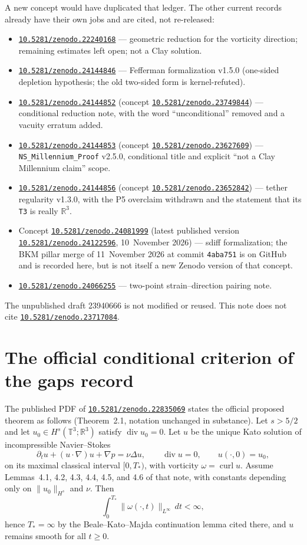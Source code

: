 \documentclass[11pt]{article}
\theoremstyle{plain}
\theoremstyle{definition}
\theoremstyle{remark}
\newcommand{\Tthree}{\mathbb{T}^{3}}
\newcommand{\R}{\mathbb{R}}
\newcommand{\doi}[1]{\href{https://doi.org/#1}{\texttt{#1}}}
\begin{document}
A new concept would have duplicated that ledger. The other current records already have their own jobs and are cited, not re-released:
\begin{itemize}[leftmargin=1.4em]
\item \doi{10.5281/zenodo.22240168} --- geometric reduction for the vorticity direction; remaining estimates left open; not a Clay solution.
\item \doi{10.5281/zenodo.24144846} --- Fefferman formalization v1.5.0 (one-sided depletion hypothesis; the old two-sided form is kernel-refuted).
\item \doi{10.5281/zenodo.24144852} (concept \doi{10.5281/zenodo.23749844}) --- conditional reduction note, with the word ``unconditional'' removed and a vacuity erratum added.
\item \doi{10.5281/zenodo.24144853} (concept \doi{10.5281/zenodo.23627609}) --- \texttt{NS\_\hspace{0pt}Millennium\_\hspace{0pt}Proof} v2.5.0, conditional title and explicit ``not a Clay Millennium claim'' scope.
\item \doi{10.5281/zenodo.24144856} (concept \doi{10.5281/zenodo.23652842}) --- tether regularity v1.3.0, with the P5 overclaim withdrawn and the statement that its \texttt{T3} is really \(\R^{3}\).
\item Concept \doi{10.5281/zenodo.24081999} (latest published version \doi{10.5281/zenodo.24122596}, 10~November 2026) --- sdiff formalization; the BKM pillar merge of 11~November 2026 at commit \texttt{4aba751} is on GitHub and is recorded here, but is not itself a new Zenodo version of that concept.
\item \doi{10.5281/zenodo.24066255} --- two-point strain--direction pairing note.
\end{itemize}
The unpublished draft 23940666 is not modified or reused. This note does not cite \doi{10.5281/zenodo.23717084}.

\section{The official conditional criterion of the gaps record}

The published PDF of \doi{10.5281/zenodo.22835069} states the official proposed theorem as follows (Theorem~2.1, notation unchanged in substance). Let \(s>5/2\) and let \(u_{0}\in H^{s}(\Tthree;\R^{3})\) satisfy \(\operatorname{div}u_{0}=0\). Let \(u\) be the unique Kato solution of incompressible Navier--Stokes
\[
\partial_{t}u+(u\cdot\nabla)u+\nabla p=\nu\Delta u,\qquad
\operatorname{div}u=0,\qquad u(\cdot,0)=u_{0},
\]
on its maximal classical interval \([0,T_{\ast})\), with vorticity \(\omega=\operatorname{curl}u\). Assume Lemmas~4.1, 4.2, 4.3, 4.4, 4.5, and 4.6 of that note, with constants depending only on \(\|u_{0}\|_{H^{s}}\) and \(\nu\). Then
\[
\int_{0}^{T_{\ast}}\|\omega(\cdot,t)\|_{L^{\infty}}\,dt<\infty,
\]
hence \(T_{\ast}=\infty\) by the Beale--Kato--Majda continuation lemma cited there, and \(u\) remains smooth for all \(t\ge 0\).
\end{document}
